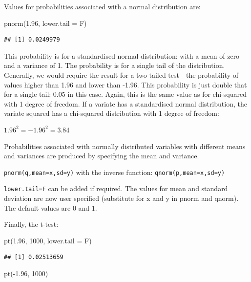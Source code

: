 \documentclass[
]{book}
\newenvironment{Shaded}{\begin{snugshade}}{\end{snugshade}}
\newcommand{\AttributeTok}[1]{\textcolor[rgb]{0.77,0.63,0.00}{#1}}
\newcommand{\DecValTok}[1]{\textcolor[rgb]{0.00,0.00,0.81}{#1}}
\newcommand{\FloatTok}[1]{\textcolor[rgb]{0.00,0.00,0.81}{#1}}
\newcommand{\FunctionTok}[1]{\textcolor[rgb]{0.00,0.00,0.00}{#1}}
\newcommand{\NormalTok}[1]{#1}
\newcommand{\SpecialCharTok}[1]{\textcolor[rgb]{0.00,0.00,0.00}{#1}}
\begin{document}
Values for probabilities associated with a normal distribution are:

\begin{Shaded}
\begin{Highlighting}[]
\FunctionTok{pnorm}\NormalTok{(}\FloatTok{1.96}\NormalTok{, }\AttributeTok{lower.tail =}\NormalTok{ F)}
\end{Highlighting}
\end{Shaded}

\begin{verbatim}
## [1] 0.0249979
\end{verbatim}

This probability is for a standardised normal distribution: with a mean of zero and a variance of 1. The probability is for a single tail of the distribution. Generally, we would require the result for a two tailed test - the probability of values higher than 1.96 and lower than -1.96. This probability is just double that for a single tail: 0.05 in this case. Again, this is the same value as for chi-squared with 1 degree of freedom. If a variate has a standardised normal distribution, the variate squared has a chi-squared distribution with 1 degree of freedom:

\(1.96^2 = -1.96^2 = 3.84\)

Probabilities associated with normally distributed variables with different means and variances are produced by specifying the mean and variance.

\texttt{pnorm(q,mean=x,sd=y)} with the inverse function: \texttt{qnorm(p,mean=x,sd=y)}

\texttt{lower.tail=F} can be added if required. The values for mean and standard deviation are now user specified (substitute for x and y in pnorm and qnorm). The default values are 0 and 1.

Finally, the t-test:

\begin{Shaded}
\begin{Highlighting}[]
\FunctionTok{pt}\NormalTok{(}\FloatTok{1.96}\NormalTok{, }\DecValTok{1000}\NormalTok{, }\AttributeTok{lower.tail =}\NormalTok{ F)}
\end{Highlighting}
\end{Shaded}

\begin{verbatim}
## [1] 0.02513659
\end{verbatim}

\begin{Shaded}
\begin{Highlighting}[]
\FunctionTok{pt}\NormalTok{(}\SpecialCharTok{{-}}\FloatTok{1.96}\NormalTok{, }\DecValTok{1000}\NormalTok{)}
\end{Highlighting}
\end{Shaded}
\end{document}
